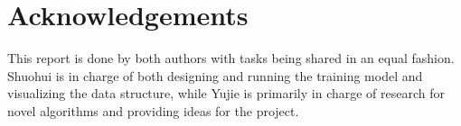 \chapter{Acknowledgements}

This report is done by both authors with tasks being shared in an equal fashion. Shuohui is in charge of both designing and running the training model and visualizing the data structure, while Yujie is primarily in charge of research for novel algorithms and providing ideas for the project.



